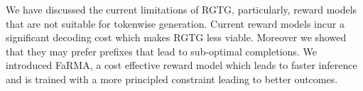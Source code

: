 
We have discussed the current limitations of RGTG, particularly, reward models that are not suitable for tokenwise generation. Current reward models incur a significant decoding cost which makes RGTG less viable. Moreover we showed that they may prefer prefixes that lead to sub-optimal completions. We introduced FaRMA, a cost effective reward model which leads to faster inference and is trained with a more principled constraint leading to better outcomes. 





